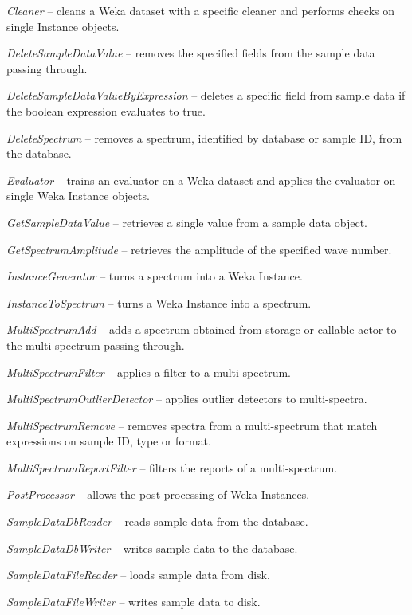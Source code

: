 \documentclass[a4paper]{book}
\begin{document}
\begin{tight_itemize}
  \item \textit{Cleaner} -- cleans a Weka dataset with a specific cleaner
  and performs checks on single Instance objects.
  \item \textit{DeleteSampleDataValue} -- removes the specified fields
  from the sample data passing through.
  \item \textit{DeleteSampleDataValueByExpression} -- deletes a specific
  field from sample data if the boolean expression evaluates to true.
  \item \textit{DeleteSpectrum} -- removes a spectrum, identified by
  database or sample ID, from the database.
  \item \textit{Evaluator} -- trains an evaluator on a Weka dataset and
  applies the evaluator on single Weka Instance objects.
  \item \textit{GetSampleDataValue} -- retrieves a single value from a
  sample data object.
  \item \textit{GetSpectrumAmplitude} -- retrieves the amplitude of the
  specified wave number.
  \item \textit{InstanceGenerator} -- turns a spectrum into a Weka Instance.
  \item \textit{InstanceToSpectrum} -- turns a Weka Instance into a spectrum.
  \item \textit{MultiSpectrumAdd} -- adds a spectrum obtained from storage or
  callable actor to the multi-spectrum passing through.
  \item \textit{MultiSpectrumFilter} -- applies a filter to a multi-spectrum.
  \item \textit{MultiSpectrumOutlierDetector} -- applies outlier detectors
  to multi-spectra.
  \item \textit{MultiSpectrumRemove} -- removes spectra from a multi-spectrum
  that match expressions on sample ID, type or format.
  \item \textit{MultiSpectrumReportFilter} -- filters the reports of a
  multi-spectrum.
  \item \textit{PostProcessor} -- allows the post-processing of Weka Instances.
  \item \textit{SampleDataDbReader} -- reads sample data from the database.
  \item \textit{SampleDataDbWriter} -- writes sample data to the database.
  \item \textit{SampleDataFileReader} -- loads sample data from disk.
  \item \textit{SampleDataFileWriter} -- writes sample data to disk.

\end{tight_itemize}
\end{document}
